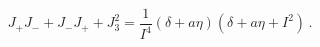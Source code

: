 \begin{equation}
J_{+}J_{-}+J_{-}J_{+}+J_3^2 =\frac{1}{I^4}
 (\delta +a\eta)(\delta +a\eta +I^2)\,.\label{eq:4.1.13}
\end{equation}


